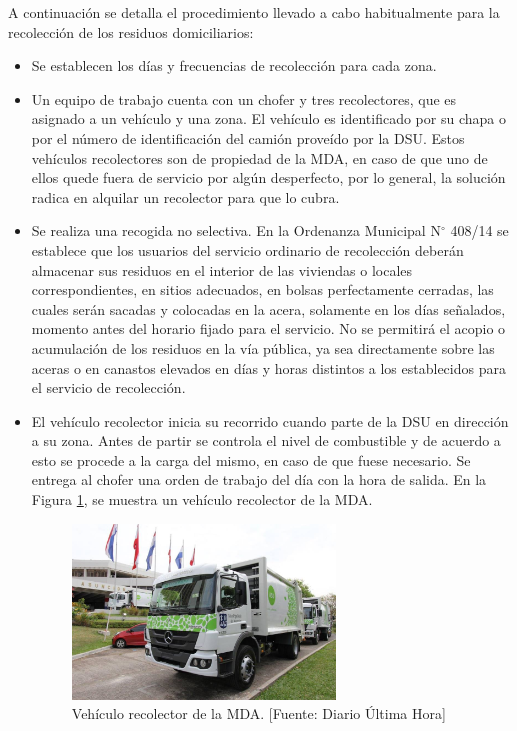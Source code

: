 A continuación se detalla el procedimiento llevado a cabo habitualmente para la recolección de los residuos domiciliarios:

\begin{itemize}
\item Se establecen los días y frecuencias de recolección para cada zona.
\item Un equipo de trabajo cuenta con un chofer y tres recolectores, que es asignado a un vehículo y una zona. El vehículo es identificado por su chapa o por el número de identificación del camión proveído por la DSU. Estos vehículos recolectores son de propiedad de la MDA, en caso de que uno de ellos quede fuera de servicio por algún desperfecto, por lo general, la solución radica en alquilar un recolector para que lo cubra.
\item Se realiza una recogida no selectiva. En la Ordenanza Municipal N$^{\circ}$ 408/14 se establece que los usuarios del servicio ordinario de recolección deberán almacenar sus residuos en el interior de las viviendas o locales correspondientes, en  sitios adecuados, en bolsas perfectamente cerradas, las cuales serán sacadas y colocadas en la acera, solamente en los días señalados, momento antes del horario fijado para el servicio. No se permitirá el acopio o acumulación de los residuos en la vía pública, ya sea directamente sobre las aceras o en canastos elevados en días y horas distintos a los establecidos para el servicio de recolección.
\item El vehículo recolector inicia su recorrido cuando parte de la DSU en dirección a su zona. Antes de partir se controla el nivel de combustible y de acuerdo a esto se procede a la carga del mismo, en caso de que fuese necesario. Se entrega al chofer una orden de trabajo del día con la hora de salida. En la Figura \ref{fig:vehiculoRecolectorMDA}, se muestra un vehículo recolector de la MDA.

\begin{figure}[H]
    \centering
    \includegraphics[width=7cm]{camion_recoletor_mda.png}
    \caption{Vehículo recolector de la MDA. [Fuente: Diario Última Hora]}
    \label{fig:vehiculoRecolectorMDA}
\end{figure}


\end{itemize}
